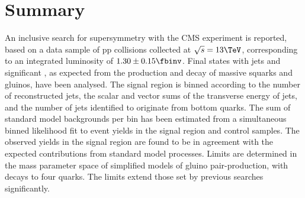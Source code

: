 \section{Summary}
\label{sec:summary}

An inclusive search for supersymmetry with the CMS experiment is
reported, based on a data sample of pp collisions collected at
$\sqrt{s} = 13\TeV$, corresponding to an integrated luminosity of 
$1.30 \pm 0.15 \fbinv$. Final states with jets and
significant \met, as expected from the production and decay of massive
squarks and gluinos, have been analysed.  The signal region is binned
according to the number of reconstructed jets, the scalar and vector sums of the
transverse energy of jets, and the number of jets identified to
originate from bottom quarks. The sum of standard model backgrounds
per bin has been estimated from a simultaneous binned likelihood fit
to event yields in the signal region and control samples. 
The observed yields in the signal region are found to be in agreement
with the expected contributions from standard model processes. Limits
are determined in the mass parameter space of simplified models of gluino pair-production, with decays to four quarks. 
The limits extend those set by previous searches significantly.

